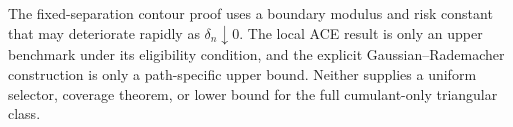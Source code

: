 The fixed-separation contour proof uses a boundary modulus and risk constant that may deteriorate rapidly as \(\delta_n\downarrow0\).  The local ACE result is only an upper benchmark under its eligibility condition, and the explicit Gaussian--Rademacher construction is only a path-specific upper bound.  Neither supplies a uniform selector, coverage theorem, or lower bound for the full cumulant-only triangular class.